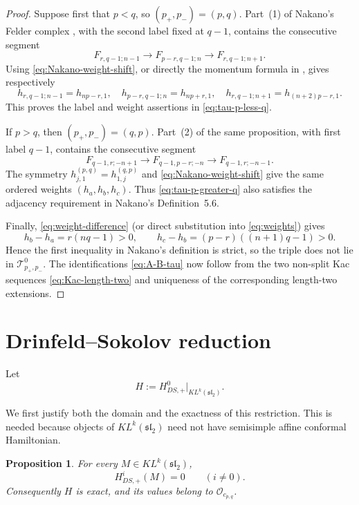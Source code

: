 \documentclass[12pt,leqno]{amsart}
\numberwithin{equation}{section}
\newtheorem{prop}[thm]{Proposition}
\newcommand{\KL}{KL}
\newcommand{\Oc}{\mathcal O}
\begin{document}
\begin{proof}
Suppose first that $p<q$, so $(p_+,p_-)=(p,q)$.  Part~(1) of Nakano's
Felder complex \cite[Proposition~2.7]{Nakano}, with the second label fixed
at $q-1$, contains the consecutive segment
\[
 F_{r,q-1;n-1}\longrightarrow F_{p-r,q-1;n}
 \longrightarrow F_{r,q-1;n+1}.
\]
Using \eqref{eq:Nakano-weight-shift}, or directly the momentum formula in
\cite[(2.1)--(2.4)]{Nakano}, gives respectively
\[
 h_{r,q-1;n-1}=h_{np-r,1},\quad
 h_{p-r,q-1;n}=h_{np+r,1},\quad
 h_{r,q-1;n+1}=h_{(n+2)p-r,1}.
\]
This proves the label and weight assertions in \eqref{eq:tau-p-less-q}.

If $p>q$, then $(p_+,p_-)=(q,p)$.  Part~(2) of the same proposition,
with first label $q-1$, contains the consecutive segment
\[
 F_{q-1,r;-n+1}\longrightarrow F_{q-1,p-r;-n}
 \longrightarrow F_{q-1,r;-n-1}.
\]
The symmetry $h^{(p,q)}_{j,1}=h^{(q,p)}_{1,j}$ and
\eqref{eq:Nakano-weight-shift} give the same ordered weights
$(h_a,h_b,h_c)$.  Thus \eqref{eq:tau-p-greater-q} also satisfies the
adjacency requirement in Nakano's Definition~5.6.

Finally, \eqref{eq:weight-difference} (or direct substitution into
\eqref{eq:weights}) gives
\[
 h_b-h_a=r(nq-1)>0,
 \qquad
 h_c-h_b=(p-r)((n+1)q-1)>0.
\]
Hence the first inequality in Nakano's definition is strict, so the triple
does not lie in $\mathcal T^0_{p_+,p_-}$.  The identifications
\eqref{eq:A-B-tau} now follow from the two non-split Kac sequences
\eqref{eq:Kac-length-two} and uniqueness of the corresponding length-two
extensions.
\end{proof}

\section{Drinfeld--Sokolov reduction}\label{sec:DS}

Let
\[
 H:=H^0_{DS,+}\big|_{\KL^k(\mathfrak{sl}_2)}.
\]

We first justify both the domain and the exactness of this restriction.  This
is needed because objects of $\KL^k(\mathfrak{sl}_2)$ need not have
semisimple affine conformal Hamiltonian.

\begin{prop}\label{prop:H-exact}
For every $M\in\KL^k(\mathfrak{sl}_2)$,
\[
 H^i_{DS,+}(M)=0\qquad(i\neq0).
\]
Consequently $H$ is exact, and its values belong to $\Oc_{c_{p,q}}$.
\end{prop}
\end{document}

